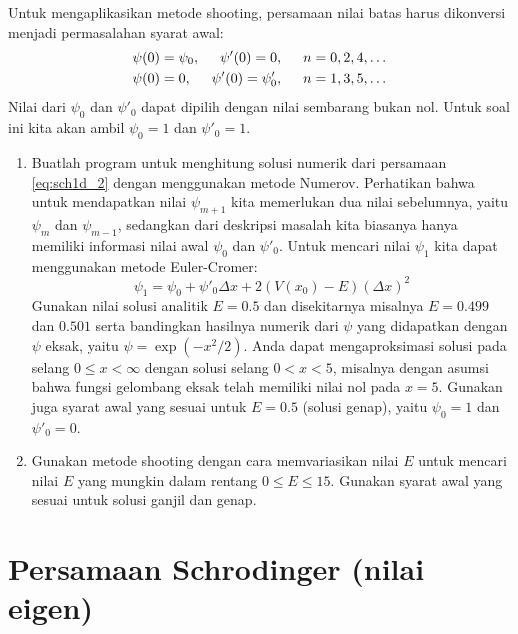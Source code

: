 \documentclass[10pt,bahasa]{article}
\begin{document}
Untuk mengaplikasikan metode shooting, persamaan nilai batas harus dikonversi menjadi
permasalahan syarat awal:
\begin{align}
\psi(0) & = \psi_{0},\hspace{0.5cm} \psi'(0) = 0,\hspace{0.5cm} n = 0,2,4,\ldots \\
\psi(0) & = 0,\hspace{0.5cm} \psi'(0) = \psi'_{0},\hspace{0.5cm} n = 1,3,5,\ldots
\end{align}
Nilai dari $\psi_0$ dan $\psi'_0$ dapat dipilih dengan nilai sembarang bukan nol.
Untuk soal ini kita akan ambil $\psi_0 = 1$ dan $\psi'_0 = 1$.

\begin{enumerate}[label=(\alph*)]
\item Buatlah program untuk menghitung solusi numerik dari persamaan \ref{eq:sch1d_2}
dengan menggunakan metode Numerov. Perhatikan bahwa untuk mendapatkan nilai $\psi_{m+1}$ kita memerlukan dua nilai
sebelumnya, yaitu $\psi_{m}$ dan $\psi_{m-1}$, sedangkan dari deskripsi masalah kita
biasanya hanya memiliki informasi nilai awal $\psi_{0}$ dan $\psi'_{0}$.
Untuk mencari nilai $\psi_{1}$ kita dapat menggunakan metode Euler-Cromer:
\begin{equation}
\psi_{1} = \psi_{0} + \psi'_{0}\Delta x + 2(V(x_{0}) - E)(\Delta x)^2
\end{equation}
Gunakan nilai solusi analitik $E = 0.5$ dan disekitarnya misalnya $E = 0.499$ dan $0.501$
serta bandingkan hasilnya numerik dari $\psi$ yang didapatkan dengan
$\psi$ eksak, yaitu $\psi = \exp(-x^2/2)$.
Anda dapat mengaproksimasi solusi pada selang $0 \leq x < \infty$
dengan solusi selang $0 < x < 5$, misalnya dengan asumsi bahwa fungsi gelombang
eksak telah memiliki nilai nol pada $x = 5$.
Gunakan juga syarat awal yang sesuai untuk $E = 0.5$ (solusi genap), yaitu
$\psi_{0} = 1$ dan $\psi'_{0} = 0$.
%
\item Gunakan metode shooting dengan cara memvariasikan nilai $E$ untuk mencari
nilai $E$ yang mungkin dalam rentang $0 \leq E \leq 15$. Gunakan syarat awal
yang sesuai untuk solusi ganjil dan genap.
\end{enumerate}


\section{Persamaan Schrodinger (nilai eigen)}
\end{document}

